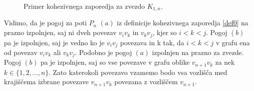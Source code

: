 \documentclass[a4paper, 12pt]{book}
\begin{document}



\begin{figure}[h]
    \begin{center}        
    \end{center}
    \caption{Primer kohezivnega zaporedja za zvezdo $K_{1, n}$.}
    \label{graf_kohezivnega_zaporedja_zvezda}
\end{figure}

Vidimo, da je pogoj za poti $P_n$ $(a)$ iz definicije kohezivnega zaporedja \ref{def0} na prazno izpolnjen, saj ni dveh povezav $v_iv_k$ in $v_kv_j$, kjer so $i < k < j$. Pogoj $(b)$ pa je izpolnjen, saj je vedno ko je $v_iv_j$ povezava in k tak, da $i < k < j$ v grafu ena od povezav $v_iv_k$ ali $v_kv_j$. Podobno je pogoj $(a)$ izpolnjen na prazno za zvezde. Pogoj $(b)$ pa je izpolnjen, saj so vse povezave v grafu oblike $v_{n+1}v_k$ za nek $k \in \{ 1, 2, ..., n \}$. Zato katerokoli povezavo vzamemo bodo vsa vozlišča med krajiščema izbrane povezave $v_{n+1}v_k$ povezana z vozliščem $v_{n+1}$.
\end{document}
